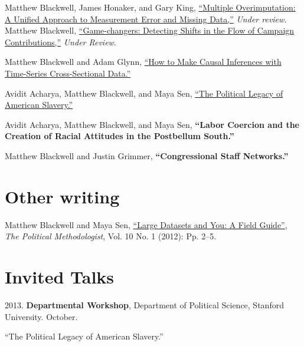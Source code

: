 \documentclass[margin,line]{res}
\newenvironment{list1}{
  \begin{list}{\ding{113}}{%
      \setlength{\itemsep}{0in}
      \setlength{\parsep}{0in} \setlength{\parskip}{0in}
      \setlength{\topsep}{0in} \setlength{\partopsep}{0in} 
      \setlength{\leftmargin}{0.83 cm}}}{\end{list}}
\begin{document}
\begin{resume}
Matthew Blackwell, James Honaker, and Gary King, \href{http://gking.harvard.edu/files/measure.pdf}{``Multiple Overimputation: A Unified Approach to Measurement Error and
Missing Data,''} \emph{Under review}.\vspace{1em}\\
Matthew Blackwell, \href{http://www.mattblackwell.org/files/papers/gamechangers.pdf}{``Game-changers: Detecting Shifts in the Flow
  of Campaign Contributions,''} \emph{Under Review}. 

Matthew Blackwell and Adam Glynn, \href{http://www.mattblackwell.org/files/papers/causal-tscs.pdf}{``How to Make Causal Inferences with Time-Series
  Cross-Sectional Data.''}

Avidit Acharya, Matthew Blackwell, and Maya Sen, \href{http://www.mattblackwell.org/files/papers/slavery.pdf}{``The Political Legacy of American Slavery.''}

Avidit Acharya, Matthew Blackwell, and Maya Sen, {\bf ``Labor Coercion and the Creation of Racial Attitudes in the Postbellum South.''}

Matthew Blackwell and Justin Grimmer, {\bf ``Congressional Staff Networks.''}



\section{\sc Other writing}

Matthew Blackwell and Maya Sen,
\href{http://polmeth.wustl.edu/methodologist/tpm_v20_n1.pdf}{``Large
  Datasets and You: A Field Guide''}, \emph{The Political
  Methodologist}, Vol. 10 No. 1 (2012): Pp. 2--5.

\section{\textsf{\sc Invited Talks}}
2013. {\bf Departmental Workshop}, Department of Political Science, Stanford University. October.
\begin{list1}
\item[] ``The Political Legacy of American Slavery.''
\end{list1}


\end{resume}
\end{document}
